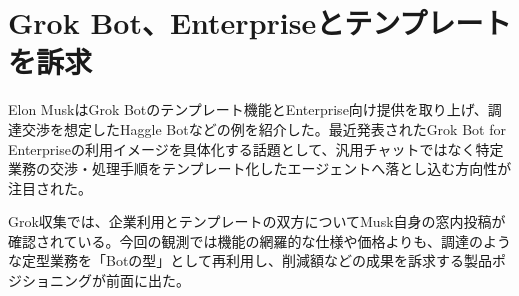 \section{Grok Bot、Enterpriseとテンプレートを訴求}

Elon MuskはGrok Botのテンプレート機能とEnterprise向け提供を取り上げ、調達交渉を想定したHaggle Botなどの例を紹介した。最近発表されたGrok Bot for Enterpriseの利用イメージを具体化する話題として、汎用チャットではなく特定業務の交渉・処理手順をテンプレート化したエージェントへ落とし込む方向性が注目された。

Grok収集では、企業利用とテンプレートの双方についてMusk自身の窓内投稿が確認されている。今回の観測では機能の網羅的な仕様や価格よりも、調達のような定型業務を「Botの型」として再利用し、削減額などの成果を訴求する製品ポジショニングが前面に出た。

